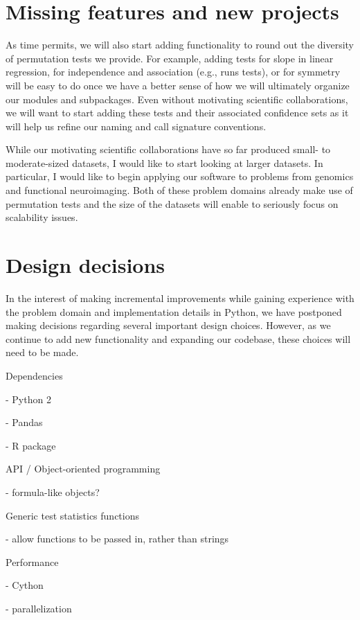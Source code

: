 %
%
%
%
%
%
%
%
%
%
%
%
%
%
%
%

\section{Missing features and new projects}

As time permits, we will also start adding functionality to round out the
diversity of permutation tests we provide.  For example, adding tests for slope
in linear regression, for independence and association (e.g., runs tests), or
for symmetry will be easy to do once we have a better sense of how we will
ultimately organize our modules and subpackages.  Even without motivating
scientific collaborations, we will want to start adding these tests and their
associated confidence sets as it will help us refine our naming and call
signature conventions.

While our motivating scientific collaborations have so far produced small- to
moderate-sized datasets, I would like to start looking at larger datasets.  In
particular, I would like to begin applying our software to problems from
genomics and functional neuroimaging.  Both of these problem domains already
make use of permutation tests and the size of the datasets will enable to
seriously focus on scalability issues.  

\section{Design decisions}

In the interest of making incremental improvements while gaining experience
with the problem domain and implementation details in Python, we have postponed
making decisions regarding several important design choices. However, as we
continue to add new functionality and expanding our codebase, these choices
will need to be made.

Dependencies

  - Python 2
  
  - Pandas
  
  
  - R package


API / Object-oriented programming

  - formula-like objects?
  
  Generic test statistics functions
  
  - allow functions to be passed in, rather than strings

Performance

  - Cython

  - parallelization
